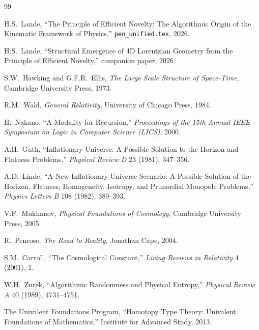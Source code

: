 \documentclass[11pt,a4paper]{article}
\theoremstyle{plain}
\theoremstyle{definition}
\theoremstyle{remark}
\begin{document}
\begin{thebibliography}{99}

H.S.\ Lande, ``The Principle of Efficient Novelty: The Algorithmic Origin of the Kinematic Framework of Physics,'' \texttt{pen\_unified.tex}, 2026.

H.S.\ Lande, ``Structural Emergence of 4D Lorentzian Geometry from the Principle of Efficient Novelty,'' companion paper, 2026.

S.W.\ Hawking and G.F.R.\ Ellis, \emph{The Large Scale Structure of Space-Time}, Cambridge University Press, 1973.

R.M.\ Wald, \emph{General Relativity}, University of Chicago Press, 1984.

H.\ Nakano, ``A Modality for Recursion,'' \emph{Proceedings of the 15th Annual IEEE Symposium on Logic in Computer Science (LICS)}, 2000.

A.H.\ Guth, ``Inflationary Universe: A Possible Solution to the Horizon and Flatness Problems,'' \emph{Physical Review D} 23 (1981), 347--356.

A.D.\ Linde, ``A New Inflationary Universe Scenario: A Possible Solution of the Horizon, Flatness, Homogeneity, Isotropy, and Primordial Monopole Problems,'' \emph{Physics Letters B} 108 (1982), 389--393.

V.F.\ Mukhanov, \emph{Physical Foundations of Cosmology}, Cambridge University Press, 2005.

R.\ Penrose, \emph{The Road to Reality}, Jonathan Cape, 2004.

S.M.\ Carroll, ``The Cosmological Constant,'' \emph{Living Reviews in Relativity} 4 (2001), 1.

W.H.\ Zurek, ``Algorithmic Randomness and Physical Entropy,'' \emph{Physical Review A} 40 (1989), 4731--4751.

The Univalent Foundations Program, ``Homotopy Type Theory: Univalent Foundations of Mathematics,'' Institute for Advanced Study, 2013.

\end{thebibliography}
\end{document}
